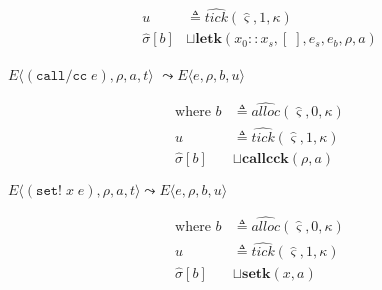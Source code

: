 \documentclass[12pt,draft]{article}
\newcommand{\callccsyn}[1]{(\texttt{call/cc}\;#1)}
\newcommand{\setsyn}[2]{(\texttt{set!}\;#1\;#2)}
\begin{document}
\begin{multicols*}{2}
\begin{align*}
u &\triangleq \widehat{tick}(\hat{\varsigma}, 1, \kappa) \\
\hat{\sigma}[b] &\sqcup \textbf{letk}(x_0::x_s, [\;], e_s, e_b, \rho, a)
\end{align*}
\begin{center}
  $E\langle \callccsyn{e} , \rho , a , t \rangle$
  $\leadsto E\langle e , \rho , b , u \rangle$
\end{center}
\vspace{-7mm}
\begin{align*}
\text{where } b &\triangleq \widehat{alloc}(\hat{\varsigma}, 0, \kappa) \\
u &\triangleq \widehat{tick}(\hat{\varsigma}, 1, \kappa) \\
\hat{\sigma}[b] &\sqcup \textbf{callcck}(\rho, a)
\end{align*}
\begin{center}
  $E\langle \setsyn{x}{e} , \rho , a , t \rangle
  \leadsto E\langle e , \rho , b , u \rangle$
\end{center}
\vspace{-7mm}
\begin{align*}
\text{where } b &\triangleq \widehat{alloc}(\hat{\varsigma}, 0, \kappa) \\
u &\triangleq \widehat{tick}(\hat{\varsigma}, 1, \kappa) \\
\hat{\sigma}[b] &\sqcup \textbf{setk}(x, a)
\end{align*}


\vfill\null
\columnbreak


\end{multicols*}
\end{document}
